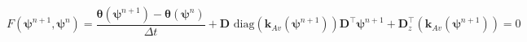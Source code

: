 \begin{equation}
\label{eq:richards-mixed-discrete-time}
    F(\boldsymbol{\psi}^{n+1},\boldsymbol{\psi}^n) = \frac{
    \boldsymbol{\theta}(\boldsymbol{\psi}^{n+1}) - \boldsymbol{\theta}(\boldsymbol{\psi}^n)
    }{\Delta t}
    + \mathbf{D}
        \text{ diag}
        \left(
            \mathbf{k}_{Av}(\boldsymbol{\psi}^{n+1})
        \right)
    \mathbf{D}^{\top} \boldsymbol{\psi}^{n+1}
    + \mathbf{D}_z^{\top}
        \left(
            \mathbf{k}_{Av}(\boldsymbol{\psi}^{n+1})
        \right)
    =
    0
\end{equation}
